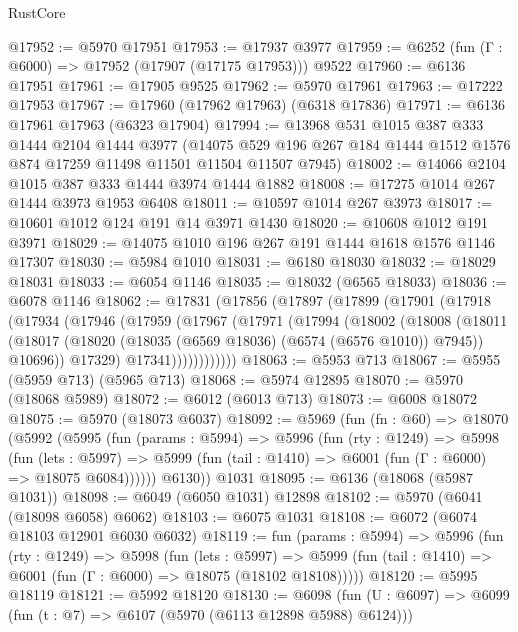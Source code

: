 \begin{lexlean}{RustCore}
\begin{coremodule}
@17952 := @5970 @17951
@17953 := @17937 @3977
@17959 := @6252 (fun (Γ : @6000) => @17952 (@17907 (@17175 @17953))) @9522
@17960 := @6136 @17951
@17961 := @17905 @9525
@17962 := @5970 @17961
@17963 := @17222 @17953
@17967 := @17960 (@17962 @17963) (@6318 @17836)
@17971 := @6136 @17961 @17963 (@6323 @17904)
@17994 := @13968
    @531
    @1015
    @387
    @333
    @1444
    @2104
    @1444
    @3977
    (@14075 @529 @196 @267 @184 @1444 @1512 @1576 @874 @17259 @11498 @11501 @11504 @11507 @7945)
@18002 := @14066 @2104 @1015 @387 @333 @1444 @3974 @1444 @1882
@18008 := @17275 @1014 @267 @1444 @3973 @1953 @6408
@18011 := @10597 @1014 @267 @3973
@18017 := @10601 @1012 @124 @191 @14 @3971 @1430
@18020 := @10608 @1012 @191 @3971
@18029 := @14075 @1010 @196 @267 @191 @1444 @1618 @1576 @1146 @17307
@18030 := @5984 @1010
@18031 := @6180 @18030
@18032 := @18029 @18031
@18033 := @6054 @1146
@18035 := @18032 (@6565 @18033)
@18036 := @6078 @1146
@18062 := @17831
    (@17856
      (@17897
        (@17899
          (@17901
            (@17918
              (@17934
                (@17946
                  (@17959
                    (@17967
                      (@17971
                        (@17994
                          (@18002
                            (@18008
                              (@18011
                                (@18017
                                  (@18020 (@18035 (@6569 @18036) (@6574 (@6576 @1010)) @7945))
                                  @10696))
                              @17329)
                            @17341))))))))))))
@18063 := @5953 @713
@18067 := @5955 (@5959 @713) (@5965 @713)
@18068 := @5974 @12895
@18070 := @5970 (@18068 @5989)
@18072 := @6012 (@6013 @713)
@18073 := @6008 @18072
@18075 := @5970 (@18073 @6037)
@18092 := @5969
    (fun (fn : @60) =>
    @18070
      (@5992
        (@5995
          (fun (params : @5994) =>
          @5996
            (fun (rty : @1249) =>
            @5998
              (fun (lets : @5997) =>
              @5999 (fun (tail : @1410) => @6001 (fun (Γ : @6000) => @18075 @6084))))))
        @6130))
    @1031
@18095 := @6136 (@18068 (@5987 @1031))
@18098 := @6049 (@6050 @1031) @12898
@18102 := @5970 (@6041 (@18098 @6058) @6062)
@18103 := @6075 @1031
@18108 := @6072 (@6074 @18103 @12901 @6030 @6032)
@18119 := fun (params : @5994) =>
  @5996
    (fun (rty : @1249) =>
    @5998
      (fun (lets : @5997) =>
      @5999 (fun (tail : @1410) => @6001 (fun (Γ : @6000) => @18075 (@18102 @18108)))))
@18120 := @5995 @18119
@18121 := @5992 @18120
@18130 := @6098
    (fun (U : @6097) => @6099 (fun (t : @7) => @6107 (@5970 (@6113 @12898 @5988) @6124)))

\end{coremodule}
\end{lexlean}
